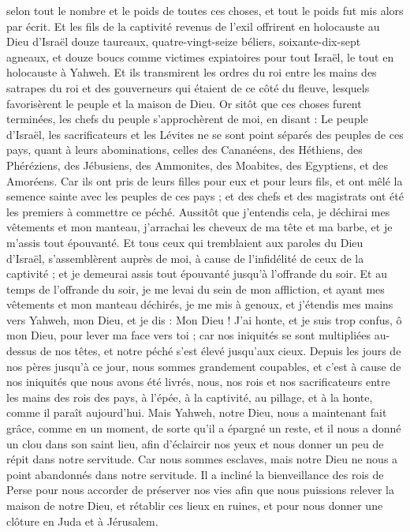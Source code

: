 \begin{multicols}{2}
 selon tout le nombre et le poids de toutes ces choses, et tout le poids fut mis alors par écrit.
Et les fils de la captivité revenus de l’exil offrirent en holocauste au Dieu d'Israël douze taureaux, quatre-vingt-seize béliers, soixante-dix-sept agneaux, et douze boucs comme victimes expiatoires pour tout Israël, le tout en holocauste à Yahweh.
Et ils transmirent les ordres du roi entre les mains des satrapes du roi et des gouverneurs qui étaient de ce côté du fleuve, lesquels favorisèrent le peuple et la maison de Dieu.
\VerseOne{}Or sitôt que ces choses furent terminées, les chefs du peuple s'approchèrent de moi, en disant : Le peuple d'Israël, les sacrificateurs et les Lévites ne se sont point séparés des peuples de ces pays, quant à leurs abominations, celles des Cananéens, des Héthiens, des Phéréziens, des Jébusiens, des Ammonites, des Moabites, des Egyptiens, et des Amoréens.
Car ils ont pris de leurs filles pour eux et pour leurs fils, et ont mêlé la semence sainte avec les peuples de ces pays ; et des chefs et des magistrats ont été les premiers à commettre ce péché.
Aussitôt que j'entendis cela, je déchirai mes vêtements et mon manteau, j'arrachai les cheveux de ma tête et ma barbe, et je m'assis tout épouvanté.
Et tous ceux qui tremblaient aux paroles du Dieu d'Israël, s'assemblèrent auprès de moi, à cause de l’infidélité de ceux de la captivité ; et je demeurai assis tout épouvanté jusqu'à l'offrande du soir.
Et au temps de l'offrande du soir, je me levai du sein de mon affliction, et ayant mes vêtements et mon manteau déchirés, je me mis à genoux, et j'étendis mes mains vers Yahweh, mon Dieu,
et je dis : Mon Dieu ! J’ai honte, et je suis trop confus, ô mon Dieu, pour lever ma face vers toi ; car nos iniquités se sont multipliées au-dessus de nos têtes, et notre péché s'est élevé jusqu’aux cieux.
Depuis les jours de nos pères jusqu'à ce jour, nous sommes grandement coupables, et c’est à cause de nos iniquités que nous avons été livrés, nous, nos rois et nos sacrificateurs entre les mains des rois des pays, à l'épée, à la captivité, au pillage, et à la honte, comme il paraît aujourd'hui.
Mais Yahweh, notre Dieu, nous a maintenant fait grâce, comme en un moment, de sorte qu'il a épargné un reste, et il nous a donné un clou dans son saint lieu, afin d'éclaircir nos yeux et nous donner un peu de répit dans notre servitude.
Car nous sommes esclaves, mais notre Dieu ne nous a point abandonnés dans notre servitude. Il a incliné la bienveillance des rois de Perse pour nous accorder de préserver nos vies afin que nous puissions relever la maison de notre Dieu, et rétablir ces lieux en ruines, et pour nous donner une clôture en Juda et à Jérusalem.

\end{multicols}
